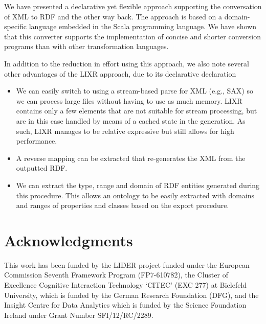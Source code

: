 \documentclass{acm_proc_article-sp}
\begin{document}
We have presented a declarative yet flexible approach supporting the conversation of XML to RDF and the other way back. The approach
is based on a domain-specific language embedded in the Scala programming language. We have shown that this converter supports the implementation of concise and shorter conversion programs than with other transformation languages.

In addition to the reduction in effort using this approach, we also note several
other advantages of the LIXR approach, due to its declarative declaration
\begin{itemize}
\item We can easily switch to using a stream-based parse for XML (e.g., SAX)
so we can process large files without having to use as much memory. LIXR
contains only a few elements that are not suitable for stream processing, but
are in this case handled by means of a cached state in the generation. As such,
LIXR manages to be relative expressive but still allows for high performance.
\item A reverse mapping can be extracted that re-generates the XML from the
outputted RDF.
\item We can extract the type, range and domain of RDF entities generated
during this procedure. This allows an ontology to be easily extracted with
domains and ranges of properties and classes based on the export procedure.
\end{itemize}


\section*{Acknowledgments}

This work has been funded by the LIDER project funded under the European Commission 
Seventh Framework
Program (FP7-610782), 
the Cluster of Excellence Cognitive
Interaction Technology `CITEC' (EXC 277) at Bielefeld University, which
is funded by the German Research Foundation (DFG), and the Insight Centre for
Data Analytics which
is funded by the Science Foundation Ireland under Grant Number SFI/12/RC/2289.



\end{document}
